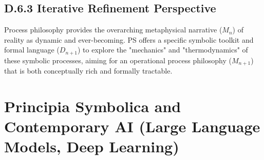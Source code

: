 \subsection*{D.6.3 Iterative Refinement Perspective}
\label{subsec:appD_process_philosophy_iterative_refinement_perspective}
Process philosophy provides the overarching metaphysical narrative (\(M_n\)) of reality as dynamic and ever-becoming. PS offers a specific symbolic toolkit and formal language (\(D_{n+1}\)) to explore the "mechanics" and "thermodynamics" of these symbolic processes, aiming for an operational process philosophy (\(M_{n+1}\)) that is both conceptually rich and formally tractable.
\section*{Principia Symbolica and Contemporary AI (Large Language Models, Deep Learning)} \label{sec:appD_ps_and_contemporary_ai}
